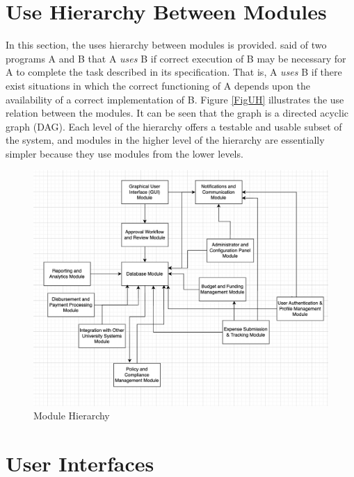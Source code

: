 \documentclass[12pt, titlepage]{article}
\begin{document}
\section{Use Hierarchy Between Modules} \label{SecUse}

In this section, the uses hierarchy between modules is
provided. \citet{Parnas1978} said of two programs A and B that A {\em uses} B if
correct execution of B may be necessary for A to complete the task described in
its specification. That is, A {\em uses} B if there exist situations in which
the correct functioning of A depends upon the availability of a correct
implementation of B.  Figure \ref{FigUH} illustrates the use relation between
the modules. It can be seen that the graph is a directed acyclic graph
(DAG). Each level of the hierarchy offers a testable and usable subset of the
system, and modules in the higher level of the hierarchy are essentially simpler
because they use modules from the lower levels.

\begin{figure}[H]
  \centering
  \includegraphics[width=1\textwidth]{img/diagram.png}
  \caption{Module Hierarchy}
  \label{fig:diagram}
\end{figure}



\section{User Interfaces} 
\end{document}
